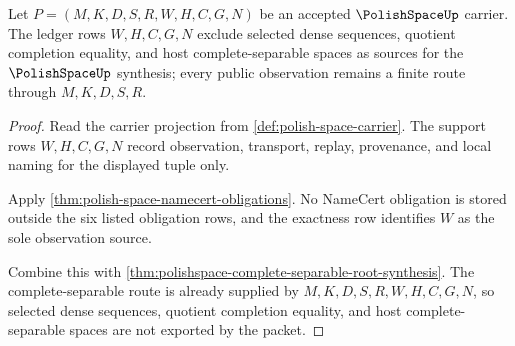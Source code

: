 \begin{theorem}
\label{thm:polishspace-choice-free-observation-ledger}
Let $P=(M,K,D,S,R,W,H,C,G,N)$ be an accepted $\PolishSpaceUp$ carrier. The
ledger rows $W,H,C,G,N$ exclude selected dense sequences, quotient completion
equality, and host complete-separable spaces as sources for the
$\PolishSpaceUp$ synthesis; every public observation remains a finite route
through $M,K,D,S,R$.
\end{theorem}
\begin{proof}
Read the carrier projection from \autoref{def:polish-space-carrier}. The
support rows $W,H,C,G,N$ record observation, transport, replay, provenance,
and local naming for the displayed tuple only.

Apply \autoref{thm:polish-space-namecert-obligations}. No NameCert obligation
is stored outside the six listed obligation rows, and the exactness row
identifies $W$ as the sole observation source.

Combine this with \autoref{thm:polishspace-complete-separable-root-synthesis}.
The complete-separable route is already supplied by $M,K,D,S,R,W,H,C,G,N$, so
selected dense sequences, quotient completion equality, and host
complete-separable spaces are not exported by the packet.
\end{proof}
